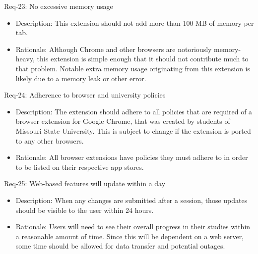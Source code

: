 \documentclass[12pt]{article}
\begin{document}
Req-23:  No excessive memory usage
\begin{itemize}
    \item Description: This extension should not add more than 100 MB of memory per tab.
    \item Rationale: Although Chrome and other browsers are notoriously memory-heavy, this extension is simple enough that it should not contribute much to that problem. Notable extra memory usage originating from this extension is likely due to a memory leak or other error.
\end{itemize}
Req-24: Adherence to browser and university policies
\begin{itemize}
    \item Description: The extension should adhere to all policies that are required of a browser extension for Google Chrome, that was created by students of Missouri State University. This is subject to change if the extension is ported to any other browsers.
    \item Rationale: All browser extensions have policies they must adhere to in order to be listed on their respective app stores.
\end{itemize}
Req-25: Web-based features will update within a day
\begin{itemize}
    \item Description: When any changes are submitted after a session, those updates should be visible to the user within 24 hours.
    \item Rationale: Users will need to see their overall progress in their studies within a reasonable amount of time. Since this will be dependent on a web server, some time should be allowed for data transfer and potential outages.
\end{itemize}




\end{document}
